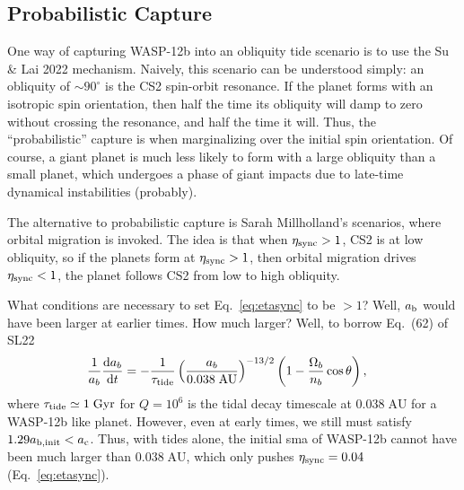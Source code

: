 \documentclass[12pt]{article}
\newcommand*{\rd}[2]{\frac{\mathrm{d}#1}{\mathrm{d}#2}}
\newcommand*{\p}[1]{\left(#1\right)}
\begin{document}
\subsection{Probabilistic Capture}

One way of capturing WASP-12b into an obliquity tide scenario is to use the Su
\& Lai 2022 mechanism. Naively, this scenario can be understood simply: an
obliquity of $\sim 90^\circ$ is the CS2 spin-orbit resonance. If the planet
forms with an isotropic spin orientation, then half the time its obliquity will
damp to zero without crossing the resonance, and half the time it will. Thus,
the ``probabilistic'' capture is when marginalizing over the initial spin
orientation. Of course, a giant planet is much less likely to form with a large
obliquity than a small planet, which undergoes a phase of giant impacts due to
late-time dynamical instabilities (probably).

The alternative to probabilistic capture is Sarah Millholland's scenarios, where
orbital migration is invoked. The idea is that when $\eta_{\rm sync} > 1$, CS2
is at low obliquity, so if the planets form at $\eta_{\rm sync} > 1$, then
orbital migration drives $\eta_{\rm sync} < 1$, the planet follows CS2 from low
to high obliquity.

What conditions are necessary to set Eq.~\eqref{eq:etasync} to be $> 1$? Well,
$a_{\rm b}$ would have been larger at earlier times. How much larger? Well, to
borrow Eq.~(62) of SL22
\begin{align}
    \frac{1}{a_b}\rd{a_b}{t}
        &= -\frac{1}{\tau_{\rm tide}}
            \p{\frac{a_b}{0.038\;\mathrm{AU}}}^{-13/2}
            \p{1 - \frac{\Omega_{b}}{n_b}\cos\theta},
\end{align}
where $\tau_{\rm tide} \simeq 1\;\mathrm{Gyr}$ for $Q = 10^6$ is the tidal decay
timescale at $0.038\;\mathrm{AU}$ for a WASP-12b like planet. However, even at
early times, we still must satisfy $1.29a_{\rm b, init} < a_{\rm c}$. Thus, with
tides alone, the initial sma of WASP-12b cannot have been much larger than
$0.038\;\mathrm{AU}$, which only pushes $\eta_{\rm sync} = 0.04$
(Eq.~\ref{eq:etasync}).
\end{document}
